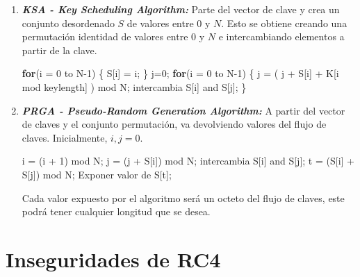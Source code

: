 \documentclass[
]{article}
\newenvironment{Shaded}{}{}
\newcommand{\ControlFlowTok}[1]{\textcolor[rgb]{0.00,0.44,0.13}{\textbf{#1}}}
\newcommand{\DecValTok}[1]{\textcolor[rgb]{0.25,0.63,0.44}{#1}}
\newcommand{\NormalTok}[1]{#1}
\newcommand{\OperatorTok}[1]{\textcolor[rgb]{0.40,0.40,0.40}{#1}}
\begin{document}
\begin{enumerate}
\def\labelenumi{\arabic{enumi}.}
\item
  \textbf{\emph{KSA - Key Scheduling Algorithm:}} Parte del vector de
  clave y crea un conjunto desordenado \(S\) de valores entre \(0\) y
  \(N\). Esto se obtiene creando una permutación identidad de valores
  entre \(0\) y \(N\) e intercambiando elementos a partir de la clave.

\begin{Shaded}
\begin{Highlighting}[]
\ControlFlowTok{for}\NormalTok{(i }\OperatorTok{=} \DecValTok{0}\NormalTok{ to N}\OperatorTok{{-}}\DecValTok{1}\NormalTok{)}
\NormalTok{\{}
\NormalTok{   S[i] }\OperatorTok{=}\NormalTok{ i}\OperatorTok{;}
\NormalTok{\}}
\NormalTok{j}\OperatorTok{=}\DecValTok{0}\OperatorTok{;}
\ControlFlowTok{for}\NormalTok{(i }\OperatorTok{=} \DecValTok{0}\NormalTok{ to N}\OperatorTok{{-}}\DecValTok{1}\NormalTok{)}
\NormalTok{\{}
\NormalTok{   j }\OperatorTok{=}\NormalTok{ ( j }\OperatorTok{+}\NormalTok{ S[i] }\OperatorTok{+}\NormalTok{ K[i mod keylength] ) mod N}\OperatorTok{;}
\NormalTok{   intercambia S[i] and S[j]}\OperatorTok{;}
\NormalTok{\}}
\end{Highlighting}
\end{Shaded}
\item
  \textbf{\emph{PRGA - Pseudo-Random Generation Algorithm:}} A partir
  del vector de claves y el conjunto permutación, va devolviendo valores
  del flujo de claves. Inicialmente, \(i, j = 0\).

\begin{Shaded}
\begin{Highlighting}[]
\NormalTok{i }\OperatorTok{=}\NormalTok{ (i }\OperatorTok{+} \DecValTok{1}\NormalTok{) mod N}\OperatorTok{;}
\NormalTok{j }\OperatorTok{=}\NormalTok{ (j }\OperatorTok{+}\NormalTok{ S[i]) mod N}\OperatorTok{;}
\NormalTok{intercambia S[i] and S[j]}\OperatorTok{;}
\NormalTok{t }\OperatorTok{=}\NormalTok{ (S[i] }\OperatorTok{+}\NormalTok{ S[j]) mod N}\OperatorTok{;}
\NormalTok{Exponer valor de S[t]}\OperatorTok{;}
\end{Highlighting}
\end{Shaded}

  Cada valor expuesto por el algoritmo será un octeto del flujo de
  claves, este podrá tener cualquier longitud que se desea.
\end{enumerate}

\hypertarget{inseguridades-de-rc4}{%
\section{Inseguridades de RC4}\label{inseguridades-de-rc4}}
\end{document}
